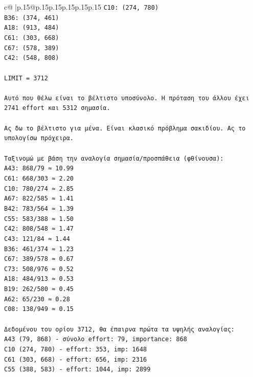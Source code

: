 \documentclass{article}
\begin{document}
{\begin{supertabular}{c@{$\;$}|p{.15\linewidth}@{}p{.15\linewidth}p{.15\linewidth}p{.15\linewidth}p{.15\linewidth}p{.15\linewidth}}
{{{\texttt{C10: (274, 780)} \\
\texttt{B36: (374, 461)} \\
\texttt{A18: (913, 484)} \\
\texttt{C61: (303, 668)} \\
\texttt{C67: (578, 389)} \\
\texttt{C42: (548, 808)} \\
\\ 
\texttt{LIMIT = 3712} \\
\\ 
\texttt{Αυτό που θέλω είναι το βέλτιστο υποσύνολο. Η πρόταση του άλλου έχει 2741 effort και 5312 σημασία.} \\
\\ 
\texttt{Ας δω το βέλτιστο για μένα. Είναι κλασικό πρόβλημα σακιδίου. Ας το υπολογίσω πρόχειρα.} \\
\\ 
\texttt{Ταξινομώ με βάση την αναλογία σημασία/προσπάθεια (φθίνουσα):} \\
\texttt{A43: 868/79 ≈ 10.99} \\
\texttt{C61: 668/303 ≈ 2.20} \\
\texttt{C10: 780/274 ≈ 2.85} \\
\texttt{A67: 822/585 ≈ 1.41} \\
\texttt{B42: 783/564 ≈ 1.39} \\
\texttt{C55: 583/388 ≈ 1.50} \\
\texttt{C42: 808/548 ≈ 1.47} \\
\texttt{C43: 121/84 ≈ 1.44} \\
\texttt{B36: 461/374 ≈ 1.23} \\
\texttt{C67: 389/578 ≈ 0.67} \\
\texttt{C73: 508/976 ≈ 0.52} \\
\texttt{A18: 484/913 ≈ 0.53} \\
\texttt{B19: 262/580 ≈ 0.45} \\
\texttt{A62: 65/230 ≈ 0.28} \\
\texttt{C08: 138/949 ≈ 0.15} \\
\\ 
\texttt{Δεδομένου του ορίου 3712, θα έπαιρνα πρώτα τα υψηλής αναλογίας:} \\
\texttt{A43 (79, 868) {-} σύνολο effort: 79, importance: 868} \\
\texttt{C10 (274, 780) {-} effort: 353, imp: 1648} \\
\texttt{C61 (303, 668) {-} effort: 656, imp: 2316} \\
\texttt{C55 (388, 583) {-} effort: 1044, imp: 2899} \\
}}}
\end{supertabular}}
\end{document}
